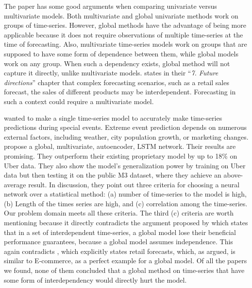 The paper \cite{Rabanser2020} has some good arguments when comparing univariate versus multivariate models.
Both multivariate and global univariate methods work on groups of time-series.
However, global methods
have the advantage of being more applicable because it does not require observations of multiple
time-series at the time of forecasting.
Also, multivariate time-series models work on groups that are supposed to have some form of
dependence between them, while global models work on any group.
When such a dependency exists, global method will not capture it directly, unlike multivariate models.
\cite{Hewamalage2021} states in their ``\textit{7. Future directions}'' chapter that complex
forecasting scenarios, such as a retail sales forecast, the sales of different products
may be interdependent.
Forecasting in such a context could require a multivariate model.

\cite{Laptev} wanted to make a single time-series model to
accurately make time-series predictions during special events.
Extreme event prediction depends on numerous external factors, including weather, city population growth, or marketing
changes.
\cite{Laptev} propose a global, multivariate, autoencoder, LSTM network.
Their results are promising. They outperform their existing
proprietary model by up to 18\% on Uber data.
They also show the model's generalization power by training on Uber data
but then testing it on the public M3 dataset, where they achieve an above-average result.
In \cite{Laptev} discussion, they point out three criteria for
choosing a neural network over a statistical method:
(a) number of time-series to the model is high, (b) Length of the
times series are high, and (c) correlation among the time-series.
Our problem domain meets all these criteria.
The third (c) criteria are worth mentioning because it directly
contradicts the argument proposed by \cite{Montero-Manso2021}%
which states that in a set of interdependent time-series,
a global model lose their beneficial performance guarantees,
because a global model assumes independence.
This again contradicts \cite{Hewamalage2021}, which explicitly states
retail forecasts, which, as argued, is similar to E-commerce,
as a perfect example for a global model.
Of all the papers we found, none of them concluded that a global method
on time-series that have some form of interdependency would directly hurt the model.



